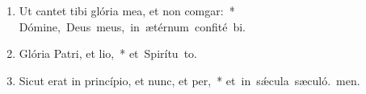 \begin{flushleft}
\begin{enumerate}[leftmargin=*]
\item Ut cantet tibi glória mea, et non comgar:~* \mbox{Dómine, Deus meus, in ætérnum confité bi.}

\item Glória Patri, et lio,~* \mbox{et Spirítu to.}

\item Sicut erat in princípio, et nunc, et per,~* \mbox{et in sǽcula sæculó. men.}

\end{enumerate}
\end{flushleft}

